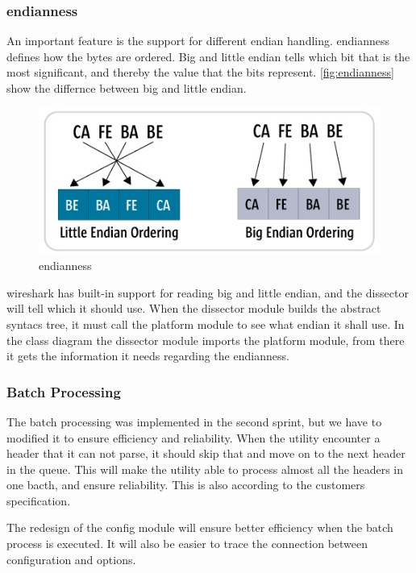 \subsubsection{\Gls{endianness}}
An important feature is the support for different \gls{endian} handling. \Gls{endianness} defines how the bytes are ordered. Big and little endian tells which bit that is the most significant, and thereby the value that the bits represent. \autoref{fig:endianness} show the differnce between big and little endian.
\begin{figure}[!htb]
	\includegraphics[width=\textwidth]{./sprints/img/endianness}
	\caption{\Gls{endianness}\cite{Endianness} \label{fig:endianness}}
\end{figure}
\Gls{wireshark} has built-in support for reading big and little \gls{endian}, and the dissector will tell which it should use. When the \gls{dissector} module builds the abstract syntacs tree, it must call the platform module to see what \gls{endian} it shall use. In the class diagram the \gls{dissector} module imports the platform module, from there it gets the information it needs regarding the \gls{endianness}. 

\subsubsection{Batch Processing}
The \gls{batch processing} was implemented in the second sprint, but we have to modified it to ensure efficiency and reliability. When the \gls{utility} encounter a \gls{header} that it can not parse, it should skip that and move on to the next \gls{header} in the queue. This will make the \gls{utility} able to process almost all the \glspl{header} in one bacth, and ensure reliability. This is also according to the customers specification.

The redesign of the config module will ensure better efficiency when the batch process is executed. It will also be easier to trace the connection between configuration and options. 

